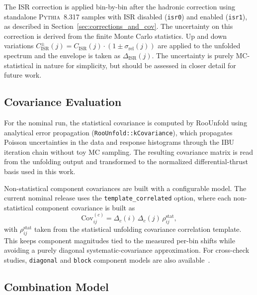 The ISR correction is applied bin-by-bin after the hadronic correction using standalone \textsc{Pythia}~8.317 samples with ISR disabled (\texttt{isr0}) and enabled (\texttt{isr1}), as described in Section~\ref{sec:corrections_and_cov}. The uncertainty on
this correction is derived from the finite Monte Carlo statistics. Up and down variations $C_{\mathrm{ISR}}^{\pm}(j) = C_{\mathrm{ISR}}(j)\cdot(1\pm\sigma_{\mathrm{rel}}(j))$ are applied to the unfolded spectrum and the envelope is taken as $\Delta_{\mathrm{ISR}}(j)$. The uncertainty is purely MC-statistical in nature for simplicity, but should be assessed in closer detail for future work. 


\subsection{Covariance Evaluation}
\label{sec:stat_covariance}

For the nominal run, the statistical covariance is computed by RooUnfold using analytical error propagation (\texttt{RooUnfold::kCovariance}), which propagates
Poisson uncertainties in the data and response histograms through the IBU iteration chain without toy MC sampling. The resulting covariance matrix is read from the unfolding output and transformed to the normalized differential-thrust basis used in this work.

Non-statistical component covariances are built with a configurable model. The current nominal release uses the \texttt{template\_correlated} option, where each non-statistical component covariance is built as
\begin{equation}
\mathrm{Cov}^{(c)}_{ij}=\Delta_c(i)\,\Delta_c(j)\,\rho^{\mathrm{stat}}_{ij},
\end{equation}
with $\rho^{\mathrm{stat}}_{ij}$ taken from the statistical unfolding covariance correlation template. This keeps component magnitudes tied to the measured per-bin
shifts while avoiding a purely diagonal systematic-covariance approximation. For cross-check studies, \texttt{diagonal} and \texttt{block} component models
are also available~\cite{Adye:2011gm}.

\subsection{Combination Model}
\label{sec:combination_model}

